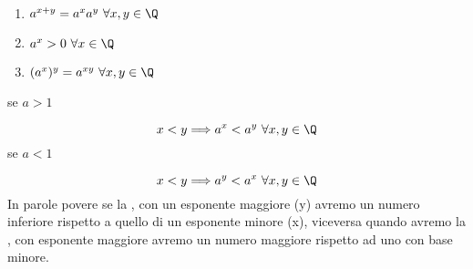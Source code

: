 \documentclass[../appunti.tex]{subfiles}
\begin{document}
\begin{enumerate}
	\item $ a^{x+y} = a^x a^y\ \forall x,y \in \Q$
	\item $ a^x > 0\ \forall x \in \Q$
	\item $ (a^x)^y = a^{xy}\ \forall x,y \in \Q$ 
\end{enumerate}
se $a > 1$

\begin{equation*}
x < y \Longrightarrow a^x < a^y\ \forall x,y \in \Q
\end{equation*}
se $a < 1$

\begin{equation*}
	x < y \Longrightarrow a^y < a^x\ \forall x,y \in \Q
\end{equation*}
In parole povere se la , con un esponente maggiore (y) avremo un numero inferiore rispetto a quello di un esponente minore (x), viceversa quando avremo la , con esponente maggiore avremo un numero maggiore rispetto ad uno con base minore.
\end{document}
